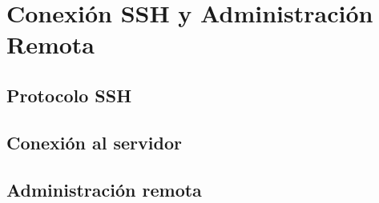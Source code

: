 \chapter{Conexión SSH y Administración Remota}
\section{Protocolo SSH}
\section{Conexión al servidor}
\section{Administración remota}
